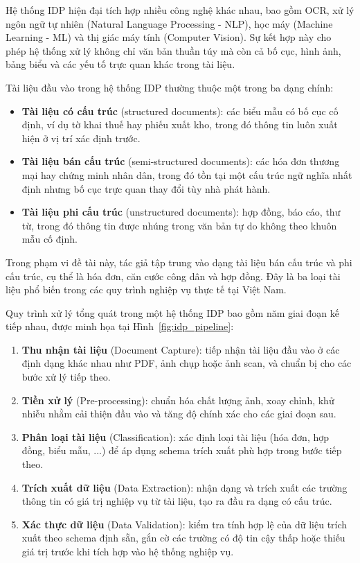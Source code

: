 ﻿\documentclass[12pt]{report}
\begin{document}
Hệ thống IDP hiện đại tích hợp nhiều công nghệ khác nhau, bao gồm OCR, xử lý ngôn ngữ tự nhiên (Natural Language Processing - NLP), học máy (Machine Learning - ML) và thị giác máy tính (Computer Vision). Sự kết hợp này cho phép hệ thống xử lý không chỉ văn bản thuần túy mà còn cả bố cục, hình ảnh, bảng biểu và các yếu tố trực quan khác trong tài liệu.

Tài liệu đầu vào trong hệ thống IDP thường thuộc một trong ba dạng chính:

\begin{itemize}
    \item \textbf{Tài liệu có cấu trúc} (structured documents): các biểu mẫu có bố cục cố định, ví dụ tờ khai thuế hay phiếu xuất kho, trong đó thông tin luôn xuất hiện ở vị trí xác định trước.
    \item \textbf{Tài liệu bán cấu trúc} (semi-structured documents): các hóa đơn thương mại hay chứng minh nhân dân, trong đó tồn tại một cấu trúc ngữ nghĩa nhất định nhưng bố cục trực quan thay đổi tùy nhà phát hành.
    \item \textbf{Tài liệu phi cấu trúc} (unstructured documents): hợp đồng, báo cáo, thư từ, trong đó thông tin được nhúng trong văn bản tự do không theo khuôn mẫu cố định.
\end{itemize}

Trong phạm vi đề tài này, tác giả tập trung vào dạng tài liệu bán cấu trúc và phi cấu trúc, cụ thể là hóa đơn, căn cước công dân và hợp đồng. Đây là ba loại tài liệu phổ biến trong các quy trình nghiệp vụ thực tế tại Việt Nam.

Quy trình xử lý tổng quát trong một hệ thống IDP bao gồm năm giai đoạn kế tiếp nhau, được minh họa tại Hình~\ref{fig:idp_pipeline}:

\begin{enumerate}
    \item \textbf{Thu nhận tài liệu} (Document Capture): tiếp nhận tài liệu đầu vào ở các định dạng khác nhau như PDF, ảnh chụp hoặc ảnh scan, và chuẩn bị cho các bước xử lý tiếp theo.
    \item \textbf{Tiền xử lý} (Pre-processing): chuẩn hóa chất lượng ảnh, xoay chỉnh, khử nhiễu nhằm cải thiện đầu vào và tăng độ chính xác cho các giai đoạn sau.
    \item \textbf{Phân loại tài liệu} (Classification): xác định loại tài liệu (hóa đơn, hợp đồng, biểu mẫu, ...) để áp dụng schema trích xuất phù hợp trong bước tiếp theo.
    \item \textbf{Trích xuất dữ liệu} (Data Extraction): nhận dạng và trích xuất các trường thông tin có giá trị nghiệp vụ từ tài liệu, tạo ra đầu ra dạng có cấu trúc.
    \item \textbf{Xác thực dữ liệu} (Data Validation): kiểm tra tính hợp lệ của dữ liệu trích xuất theo schema định sẵn, gắn cờ các trường có độ tin cậy thấp hoặc thiếu giá trị trước khi tích hợp vào hệ thống nghiệp vụ.
\end{enumerate}
\end{document}
